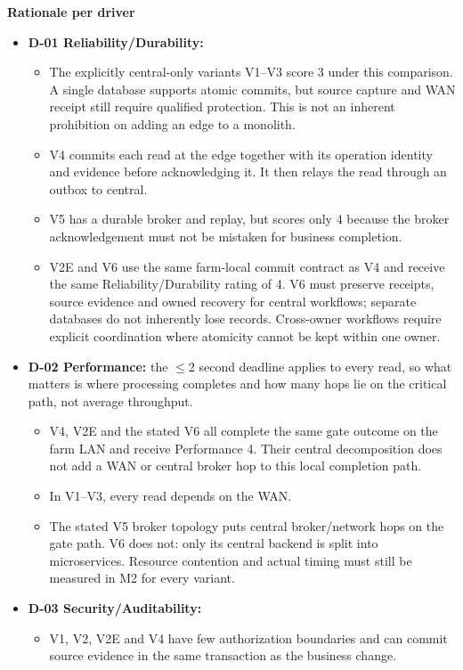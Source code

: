 \textbf{Rationale per driver}


\begin{itemize}
  \item \textbf{D-01 Reliability/Durability:}
  \begin{itemize}
    \item The explicitly central-only variants V1--V3 score 3 under this comparison. A single database supports atomic commits, but source capture and WAN receipt still require qualified protection. This is not an inherent prohibition on adding an edge to a monolith.
    \item V4 commits each read at the edge together with its operation identity and evidence before acknowledging it. It then relays the read through an outbox to central.
    \item V5 has a durable broker and replay, but scores only 4 because the broker acknowledgement must not be mistaken for business completion.
    \item V2E and V6 use the same farm-local commit contract as V4 and receive the same Reliability/Durability rating of 4. V6 must preserve receipts, source evidence and owned recovery for central workflows; separate databases do not inherently lose records. Cross-owner workflows require explicit coordination where atomicity cannot be kept within one owner.
  \end{itemize}
  \item \textbf{D-02 Performance:} the \(\leq\)2 second deadline applies to every read, so what matters is where processing completes and how many hops lie on the critical path, not average throughput.
  \begin{itemize}
    \item V4, V2E and the stated V6 all complete the same gate outcome on the farm LAN and receive Performance 4. Their central decomposition does not add a WAN or central broker hop to this local completion path.
    \item In V1--V3, every read depends on the WAN.
    \item The stated V5 broker topology puts central broker/network hops on the gate path. V6 does not: only its central backend is split into microservices. Resource contention and actual timing must still be measured in M2 for every variant.
  \end{itemize}
  \item \textbf{D-03 Security/Auditability:}
  \begin{itemize}
    \item V1, V2, V2E and V4 have few authorization boundaries and can commit source evidence in the same transaction as the business change.

\end{itemize}
\end{itemize}
